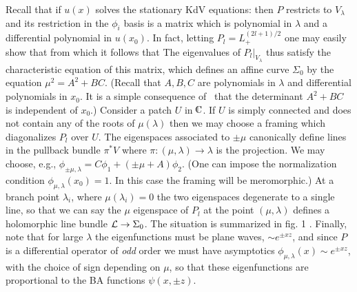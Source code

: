 Recall that
if $u(x)$ solves the stationary KdV equations:
\eqn{}
then $P$ restricts to $V_\lambda$ and its restriction in 
the $\phi_i$ basis is a matrix which is polynomial in 
$\lambda$ and a differential polynomial in $u(x_0)$. 
In fact, letting $P_l=L^{(2l+1)/2}_+$ one may easily 
show that 
\eqn{}
from which it follows that 
\eqn{}
The eigenvalues of $P_l|_{V_\lambda}$ thus satisfy the 
characteristic equation of this matrix, 
which defines an affine curve
$\Sigma_0$ by the equation 
$\mu^2=A^2+BC$. (Recall that $A,B,C$ are polynomials in 
$\lambda$ and differential polynomials in $x_0$. It is 
a simple consequence of \stKdV\ that the determinant 
$A^2+BC$ is independent of $x_0$.)
Consider a patch $U$ in $\IC$. If $U$ is simply connected and
does not contain any 
of the roots of $\mu(\lambda)$ then we may choose a framing which 
diagonalizes $P_l$ over $U$. The eigenspaces associated to $\pm \mu$
canonically define lines in the pullback bundle $\pi^*V$
where $\pi:(\mu,\lambda)\to \lambda$ is the projection.
We may choose, e.g., $\phi_{\pm\mu,\lambda}=C\phi_1 + (\pm\mu+A)\phi_2$.
(One can impose the normalization condition 
$\phi_{\mu,\lambda}(x_0)=1$.
In this case the framing will be meromorphic.)
At a branch 
point $\lambda_i$, where $\mu(\lambda_i)=0$ the two 
eigenspaces degenerate to a single line, so that we can 
say the $\mu$ eigenspace of $P_l$ at the point $(\mu,\lambda)$
defines a holomorphic line bundle ${\cal L}\to \Sigma_0$. 
The situation is summarized in fig. 1
.
Finally, note that for large $\lambda$ the eigenfunctions must 
be plane waves,
$\sim e^{\pm xz}$,
and since $P$ is a differential operator of {\it  odd} order we must
have asymptotics $\phi_{\mu,\lambda}(x)\sim e^{\pm xz}$, with the 
choice of sign depending on $\mu$, so that these eigenfunctions 
are proportional to the BA functions $\psi(x,\pm z)$.

